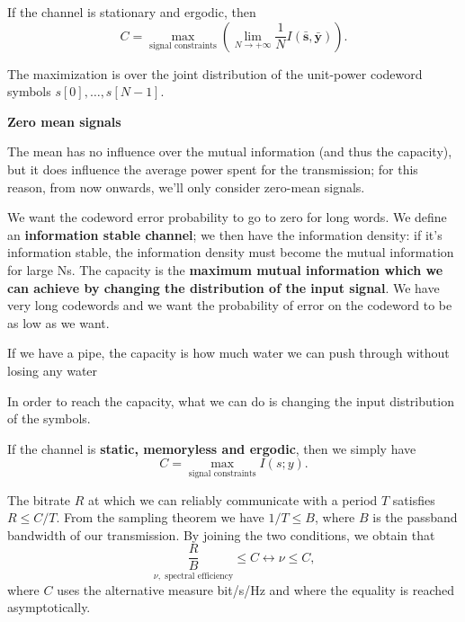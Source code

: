 \documentclass[a4paper, 11pt]{book}
\begin{document}
If the channel is stationary and ergodic, then
$$
C = \max_{\text{signal constraints}} \left( \lim_{N \to +\infty} \frac{1}{N} I(\bar{\bm{s}}, \bar{\bm{y}}) \right) \text{.}
$$

\begin{tcolorbox}[frame empty, sharp corners, boxrule=0pt, leftrule=2pt, colframe=green!60!black, colback=green!5, left=5pt, top=3pt, bottom=3pt]
    The maximization is over the joint distribution of the unit-power codeword symbols $s[0], \dots, s[N-1]$.
\end{tcolorbox}

\vspace{0.5em}

\begin{tcolorbox}[colframe=cyan!80!blue, colback=white, boxrule=1pt, arc=2pt]
    \textcolor{cyan!80!blue}{\textbf{\small {} Zero mean signals}}

    The mean has no influence over the mutual information (and thus the capacity), but it does influence the average power spent for the transmission; for this reason, from now onwards, we'll only consider zero-mean signals.
\end{tcolorbox}

\vspace{1em}

We want the codeword error probability to go to zero for long words.
We define an \textbf{information stable channel}; we then have the information density: if it's information stable, the information density must become the mutual information for large Ns.
The capacity is the \textbf{maximum mutual information which we can achieve by changing the distribution of the input signal}.
We have very long codewords and we want the probability of error on the codeword to be as low as we want.

\begin{tcolorbox}[frame empty, sharp corners, boxrule=0pt, leftrule=2pt, colframe=green!60!black, colback=green!5, left=5pt, top=3pt, bottom=3pt]
    If we have a pipe, the capacity is how much water we can push through without losing any water
\end{tcolorbox}

In order to reach the capacity, what we can do is changing the input distribution of the symbols.

If the channel is \textbf{static, memoryless and ergodic}, then we simply have
$$
C = \max_{\text{signal constraints}} I(s; y) \text{.}
$$

The bitrate $R$ at which we can reliably communicate with a period $T$ satisfies $R \le C/T$.
From the sampling theorem we have $1/T \le B$, where $B$ is the passband bandwidth of our transmission. By joining the two conditions, we obtain that
$$
\underset{\nu, \text{ spectral efficiency}}{\frac{R}{B}} \le C \leftrightarrow \nu \le C \text{,}
$$
where $C$ uses the alternative measure bit/s/Hz and where the equality is reached asymptotically.
\end{document}
